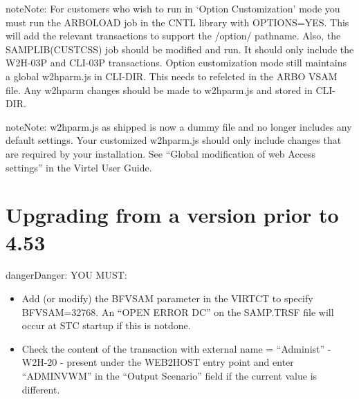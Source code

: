 \documentclass[letterpaper,10pt,english]{sphinxmanual}
\begin{document}
\begin{sphinxadmonition}{note}{Note:}
For customers who wish to run in ‘Option Customization’ mode you must run the ARBOLOAD job in the CNTL library with OPTIONS=YES. This will add the relevant transactions to support the /option/ pathname. Also, the SAMPLIB(CUSTCSS) job should be modified and run. It should only include the W2H-03P and CLI-03P transactions. Option customization mode still maintains a global w2hparm.js in CLI-DIR. This needs to refelcted in the ARBO VSAM file. Any w2hparm changes should be made to w2hparm.js and stored in CLI-DIR.
\end{sphinxadmonition}

\begin{sphinxadmonition}{note}{Note:}
w2hparm.js as shipped is now a dummy file and no longer includes any default settings. Your customized w2hparm.js should only include changes that are required by your installation. See “Global modification of web Access settings” in the Virtel User Guide.
\end{sphinxadmonition}

\ignorespaces 

\section{Upgrading from a version prior to 4.53}
\label{\detokenize{Migration_Guide:upgrading-from-a-version-prior-to-4-53}}\label{\detokenize{Migration_Guide:index-3}}
\begin{sphinxadmonition}{danger}{Danger:}
YOU MUST:
\end{sphinxadmonition}
\begin{itemize}
\item {} 
Add (or modify) the BFVSAM parameter in the VIRTCT to specify BFVSAM=32768. An “OPEN ERROR DC” on the SAMP.TRSF file will occur at STC startup if this is notdone.

\item {} 
Check the content of the transaction with external name = “Administ” - W2H-20 - present under the WEB2HOST entry point and enter “ADMINVWM” in the “Output Scenario” field if the current value is different.

\end{itemize}
\end{document}
